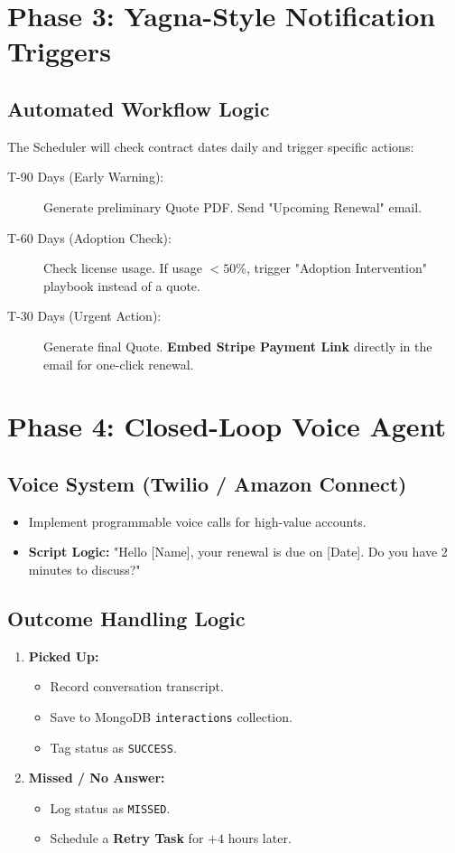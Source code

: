 \documentclass[11pt,a4paper]{article}
\begin{document}
\section{Phase 3: Yagna-Style Notification Triggers}
\subsection{Automated Workflow Logic}
The Scheduler will check contract dates daily and trigger specific actions:

\begin{description}
    \item[T-90 Days (Early Warning):] Generate preliminary Quote PDF. Send "Upcoming Renewal" email.
    \item[T-60 Days (Adoption Check):] Check license usage. If usage $<50\%$, trigger "Adoption Intervention" playbook instead of a quote.
    \item[T-30 Days (Urgent Action):] Generate final Quote. \textbf{Embed Stripe Payment Link} directly in the email for one-click renewal.
\end{description}

\section{Phase 4: Closed-Loop Voice Agent}
\subsection{Voice System (Twilio / Amazon Connect)}
\begin{itemize}
    \item Implement programmable voice calls for high-value accounts.
    \item \textbf{Script Logic:} "Hello [Name], your renewal is due on [Date]. Do you have 2 minutes to discuss?"
\end{itemize}

\subsection{Outcome Handling Logic}
\begin{enumerate}
    \item \textbf{Picked Up:}
    \begin{itemize}
        \item Record conversation transcript.
        \item Save to MongoDB \texttt{interactions} collection.
        \item Tag status as \texttt{SUCCESS}.
    \end{itemize}
    
    \item \textbf{Missed / No Answer:}
    \begin{itemize}
        \item Log status as \texttt{MISSED}.
        \item Schedule a \textbf{Retry Task} for $+4$ hours later.
    \end{itemize}
\end{enumerate}
\end{document}
